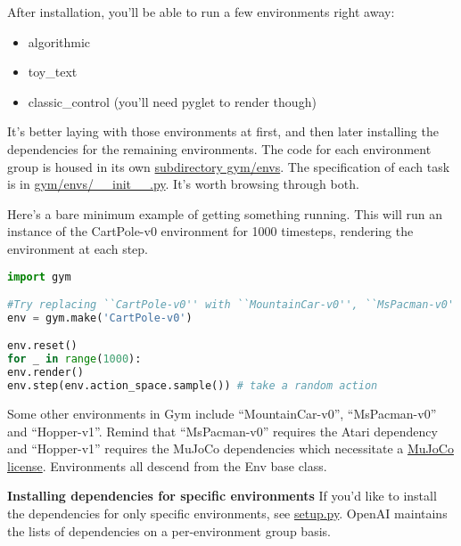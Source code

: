After installation, you'll be able to run a few environments right away:
\begin{itemize}
	\item algorithmic
	\item toy\_text
	\item classic\_control (you'll need pyglet to render though)
\end{itemize}

It's better laying with those environments at first, and then later installing the dependencies for the remaining environments. The code for each environment group is housed in its own \href{https://github.com/openai/gym/blob/master/gym/envs}{subdirectory gym/envs}. The specification of each task is in \href{https://github.com/openai/gym/blob/master/gym/envs/__init__.py}{gym/envs/\_\_init\_\_.py}. It's worth browsing through both.

Here’s a bare minimum example of getting something running. This will run an instance of the CartPole-v0 environment for 1000 timesteps, rendering the environment at each step. 


\begin{lstlisting}[language=python,caption={CartPole Env}]  
import gym

#Try replacing ``CartPole-v0'' with ``MountainCar-v0'', ``MsPacman-v0'', or ``Hopper-v1''.
env = gym.make('CartPole-v0') 

env.reset()
for _ in range(1000):
env.render()
env.step(env.action_space.sample()) # take a random action
\end{lstlisting}  \label{lst:cartpole_env}

Some other environments in Gym include ``MountainCar-v0'', ``MsPacman-v0'' and ``Hopper-v1''. Remind that ``MsPacman-v0'' requires the Atari dependency and ``Hopper-v1'' requires the MuJoCo dependencies which necessitate  a \href{https://www.roboti.us/license.html}{MuJoCo license}. Environments all descend from the Env base class.

\textbf{Installing dependencies for specific environments}
If you'd like to install the dependencies for only specific environments, see \href{https://github.com/openai/gym/blob/master/setup.py}{setup.py}. OpenAI maintains the lists of dependencies on a per-environment group basis.

